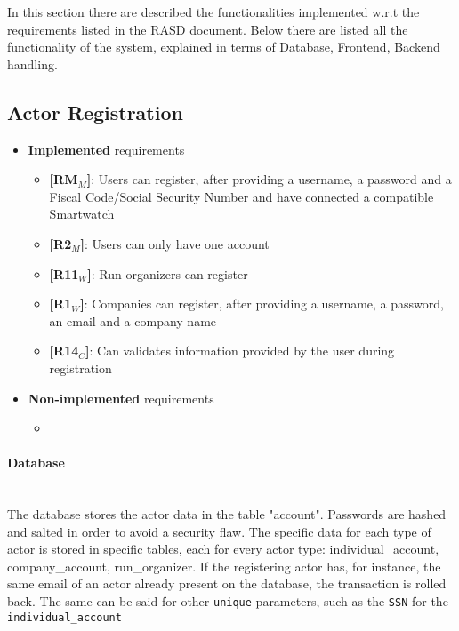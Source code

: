 In this section there are described the functionalities implemented w.r.t the requirements listed in the RASD document.
Below there are listed all the functionality of the system, explained in terms of Database, Frontend, Backend handling.



\subsection{Actor Registration}
\begin{itemize}
\item \textbf{Implemented} requirements
        \begin{itemize}
   \item \textbf{[RM$_M$]}: Users can register, after providing a username, a password and a Fiscal Code/Social Security Number and have connected a compatible Smartwatch
    \item \textbf{[R2$_M$]}: Users can only have one account 
    
  \item \textbf{[R11$_W$]}: Run organizers can register
    
    \item \textbf{[R1$_W$]}: Companies can register, after providing a username, a password, an email and a company name

    \item \textbf{[R14$_C$]}: Can validates information provided by the user during registration

        \end{itemize}
    \item \textbf{Non-implemented} requirements
    \begin{itemize}
            \item 
        \end{itemize}
\end{itemize}

\paragraph{Database} \mbox{}\\ 
The database stores the actor data in the table "account".
Passwords are hashed and salted in order to avoid a security flaw.
The specific data for each type of actor is stored in specific tables, each for every actor type: individual\_account, company\_account, run\_organizer.
If the registering actor has, for instance, the same email of an actor already present on the database, the transaction is rolled back.
The same can be said for other \texttt{unique} parameters, such as the \texttt{SSN} for the \texttt{individual\_account}

